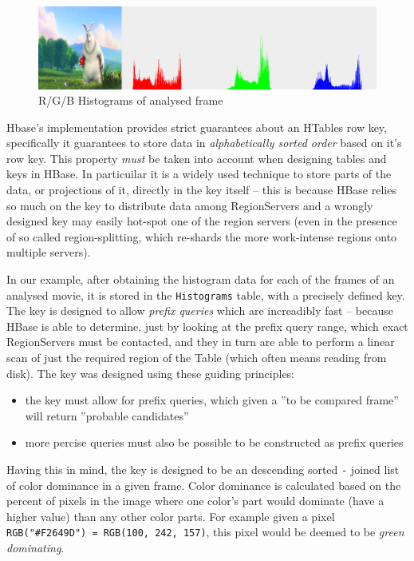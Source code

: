 \begin{figure}[ch!]
  \centering
  \includegraphics[width=\textwidth]{img/Histograms__Big_Buck_Bunny_mirror_png.png}
  \caption{R/G/B Histograms of analysed frame}
\end{figure}

Hbase's implementation provides strict guarantees about an HTables row key, specifically it guarantees to store data in \textit{alphabetically sorted order} based on it's row key. This property \textit{must} be taken into account when designing tables and keys in HBase. In particuilar it is a widely used technique to store parts of the data, or projections of it, directly in the key itself -- this is because HBase relies so much on the key to distribute data among RegionServers and a wrongly designed key may easily hot-spot one of the region servers (even in the presence of so called region-splitting, which re-shards the more work-intense regions onto multiple servers).

In our example, after obtaining the histogram data for each of the frames of an analysed movie, it is stored in the \verb|Histograms| table, with a precisely defined key. The key is designed to allow \textit{prefix queries} which are increadibly fast -- because HBase is able to determine, just by looking at the prefix query range, which exact RegionServers must be contacted, and they in turn are able to perform a linear scan of just the required region of the Table (which often means reading from disk). The key was designed using these guiding principles:

\begin{itemize}
 \item the key must allow for prefix queries, which given a ''to be compared frame'' will return ''probable candidates''
 \item more percise queries must also be possible to be constructed as prefix queries
\end{itemize}

Having this in mind, the key is designed to be an descending sorted \verb|-| joined list of color dominance in a given frame. Color dominance is calculated based on the percent of pixels in the image where one color's part would dominate (have a higher value) than any other color parts. For example given a pixel  \verb|RGB("#F2649D") = RGB(100, 242, 157)|, this pixel would be deemed to be \textit{green dominating}. 


